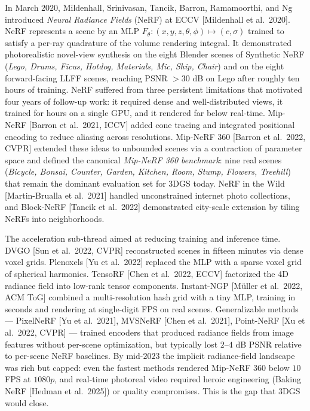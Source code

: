 In March \(2020\), Mildenhall, Srinivasan, Tancik, Barron, Ramamoorthi, and Ng introduced \emph{Neural Radiance Fields} (NeRF) at ECCV {[}Mildenhall et al.~2020{]}. NeRF represents a scene by an MLP \(F_\theta:(x,y,z,\theta,\phi)\mapsto(c,\sigma)\) trained to satisfy a per-ray quadrature of the volume rendering integral. It demonstrated photorealistic novel-view synthesis on the eight Blender scenes of Synthetic NeRF (\emph{Lego, Drums, Ficus, Hotdog, Materials, Mic, Ship, Chair}) and on the eight forward-facing LLFF scenes, reaching PSNR \(>30\) dB on Lego after roughly ten hours of training. NeRF suffered from three persistent limitations that motivated four years of follow-up work: it required dense and well-distributed views, it trained for hours on a single GPU, and it rendered far below real-time. Mip-NeRF {[}Barron et al.~2021, ICCV{]} added cone tracing and integrated positional encoding to reduce aliasing across resolutions. Mip-NeRF 360 {[}Barron et al.~2022, CVPR{]} extended these ideas to unbounded scenes via a contraction of parameter space and defined the canonical \emph{Mip-NeRF 360 benchmark}: nine real scenes (\emph{Bicycle, Bonsai, Counter, Garden, Kitchen, Room, Stump, Flowers, Treehill}) that remain the dominant evaluation set for 3DGS today. NeRF in the Wild {[}Martin-Brualla et al.~2021{]} handled unconstrained internet photo collections, and Block-NeRF {[}Tancik et al.~2022{]} demonstrated city-scale extension by tiling NeRFs into neighborhoods.

The acceleration sub-thread aimed at reducing training and inference time. DVGO {[}Sun et al.~2022, CVPR{]} reconstructed scenes in fifteen minutes via dense voxel grids. Plenoxels {[}Yu et al.~2022{]} replaced the MLP with a sparse voxel grid of spherical harmonics. TensoRF {[}Chen et al.~2022, ECCV{]} factorized the 4D radiance field into low-rank tensor components. Instant-NGP {[}Müller et al.~2022, ACM ToG{]} combined a multi-resolution hash grid with a tiny MLP, training in seconds and rendering at single-digit FPS on real scenes. Generalizable methods --- PixelNeRF {[}Yu et al.~2021{]}, MVSNeRF {[}Chen et al.~2021{]}, Point-NeRF {[}Xu et al.~2022, CVPR{]} --- trained encoders that produced radiance fields from image features without per-scene optimization, but typically lost \(2\)--\(4\) dB PSNR relative to per-scene NeRF baselines. By mid-\(2023\) the implicit radiance-field landscape was rich but capped: even the fastest methods rendered Mip-NeRF 360 below \(10\) FPS at \(1080p\), and real-time photoreal video required heroic engineering (Baking NeRF {[}Hedman et al.~2025{]}) or quality compromises. This is the gap that 3DGS would close.

